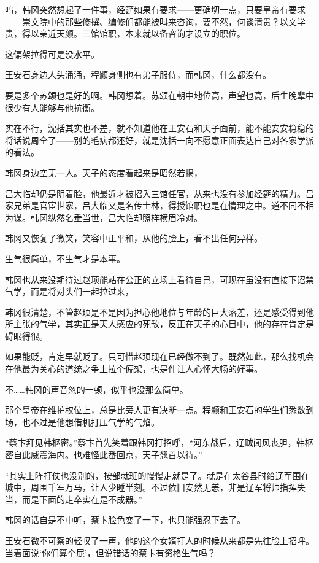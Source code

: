 呜，韩冈突然想起了一件事，经筵如果有要求——更确切一点，只要皇帝有要求——崇文院中的那些修撰、编修们都能被叫来咨询，要不然，何谈清贵？以文学贵，得以亲近天颜。三馆馆职，本来就以备咨询才设立的职位。

这偏架拉得可是没水平。

王安石身边人头涌涌，程颢身侧也有弟子服侍，而韩冈，什么都没有。

要是多个苏颂也是好的啊。韩冈想着。苏颂在朝中地位高，声望也高，后生晚辈中很少有人能够与他抗衡。

实在不行，沈括其实也不差，就不知道他在王安石和天子面前，能不能安安稳稳的将话说周全了——别的毛病都还好，就是沈括一向不愿意正面表达自己对各家学派的看法。

韩冈身边空无一人。天子的态度看起来是昭然若揭，

吕大临却仍是阴着脸，他最近才被招入三馆任官，从来也没有参加经筵的精力。吕家兄弟是官宦世家，吕大临又是名传士林，得授馆职也是在情理之中。道不同不相为谋。韩冈纵然名垂当世，吕大临却照样横眉冷对。

韩冈又恢复了微笑，笑容中正平和，从他的脸上，看不出任何异样。

生气很简单，不生气才是本事。

韩冈也从来没期待过赵顼能站在公正的立场上看待自己，可现在虽没有直接下诏禁气学，而是将对头们一起拉过来，

韩冈很清楚，不管赵顼是不是因为担心他地位与年龄的巨大落差，还是感受得到他所主张的气学，其实正是天人感应的死敌，反正在天子的心目中，他的存在肯定是碍眼得很。

如果能贬，肯定早就贬了。只可惜赵顼现在已经做不到了。既然如此，那么找机会在他最为关心的道统之争上拉个偏架，也是件让人心怀大畅的好事。

不……韩冈的声音忽的一顿，似乎也没那么简单。

那个皇帝在维护权位上，总是比旁人更有决断一点。程颢和王安石的学生们悉数到场，也不过是他想借机打压气学的气焰。

“蔡卞拜见韩枢密。”蔡卞首先笑着跟韩冈打招呼，“河东战后，辽贼闻风丧胆，韩枢密自此威震海内。也难怪此番回京，天子翘首以待。”

“其实上阵打仗也没别的，按部就班的慢慢走就是了。就是在太谷县时给辽军围在城中，周围千军万马，让人少睡半刻。不过依旧安然无恙，非是辽军将帅指挥失当，而是下面的走卒实在是不成器。”

韩冈的话自是不中听，蔡卞脸色变了一下，也只能强忍下去了。

王安石微不可察的轻叹了一声，他的这个女婿打人的时候从来都是先往脸上招呼。当着面说‘你们算个屁’，但说错话的蔡卞有资格生气吗？

